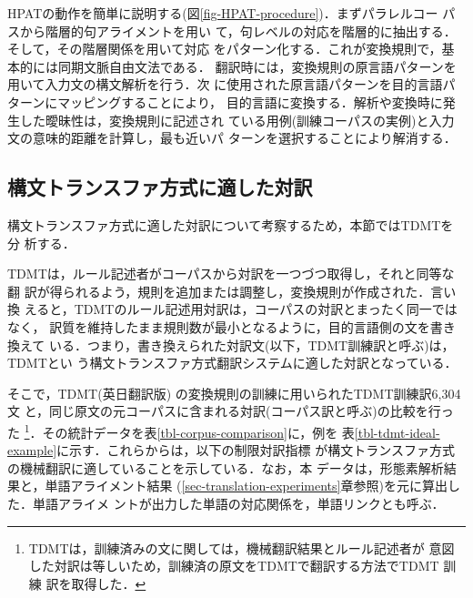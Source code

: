 HPATの動作を簡単に説明する(図\ref{fig-HPAT-procedure})．まずパラレルコー
パスから階層的句アライメント\cite{Imamura:PhraseAlignment2002j}を用い
て，句レベルの対応を階層的に抽出する．そして，その階層関係を用いて対応
をパターン化する．これが変換規則で，基本的には同期文脈自由文法である．
翻訳時には，変換規則の原言語パターンを用いて入力文の構文解析を行う．次
に使用された原言語パターンを目的言語パターンにマッピングすることにより，
目的言語に変換する．解析や変換時に発生した曖昧性は，変換規則に記述され
ている用例(訓練コーパスの実例)と入力文の意味的距離を計算し，最も近いパ
ターンを選択することにより解消する．

\subsection{構文トランスファ方式に適した対訳}
\label{sec-suitable-translation}

構文トランスファ方式に適した対訳について考察するため，本節ではTDMTを分
析する．

TDMTは，ルール記述者がコーパスから対訳を一つづつ取得し，それと同等な翻
訳が得られるよう，規則を追加または調整し，変換規則が作成された．言い換
えると，TDMTのルール記述用対訳は，コーパスの対訳とまったく同一ではなく，
訳質を維持したまま規則数が最小となるように，目的言語側の文を書き換えて
いる．つまり，書き換えられた対訳文(以下，TDMT訓練訳と呼ぶ)は，TDMTとい
う構文トランスファ方式翻訳システムに適した対訳となっている．

そこで，TDMT(英日翻訳版) の変換規則の訓練に用いられたTDMT訓練訳6,304文
と，同じ原文の元コーパスに含まれる対訳(コーパス訳と呼ぶ)の比較を行った
\footnote{TDMTは，訓練済みの文に関しては，機械翻訳結果とルール記述者が
意図した対訳は等しいため，訓練済の原文をTDMTで翻訳する方法でTDMT 訓練
訳を取得した．}．その統計データを表\ref{tbl-corpus-comparison}に，例を
表\ref{tbl-tdmt-ideal-example}に示す．これらからは，以下の制限対訳指標
が構文トランスファ方式の機械翻訳に適していることを示している．なお，本
データは，形態素解析結果と，単語アライメント結果
(\ref{sec-translation-experiments}章参照)を元に算出した．単語アライメ
ントが出力した単語の対応関係を，単語リンクとも呼ぶ．

